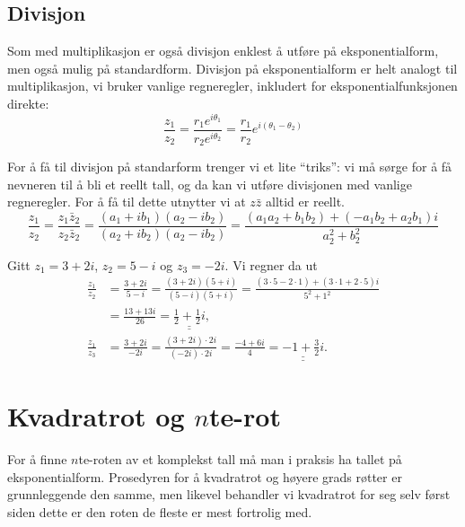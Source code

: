 \documentclass[a4paper,norsk,12pt]{article}
\newcommand{\ans}[1]{\underline{\underline{#1}}}
\newcounter{exa}
\begin{document}
\subsection{Divisjon}
Som med multiplikasjon er også divisjon enklest å utføre på eksponentialform, men også mulig på standardform. Divisjon på eksponentialform er helt analogt til multiplikasjon, vi bruker vanlige regneregler, inkludert for eksponentialfunksjonen direkte:
\begin{displaymath}
	\frac{z_1}{z_2} = \frac{r_1e^{i\theta_1}}{r_2e^{i\theta_2}} = \frac{r_1}{r_2}e^{i(\theta_1-\theta_2)}
\end{displaymath}
\begin{texample}
\end{texample}
For å få til divisjon på standarform trenger vi et lite ``triks'': vi må sørge for å få nevneren til å bli et reellt tall, og da kan vi utføre divisjonen med vanlige regneregler. For å få til dette utnytter vi at $z\bar{z}$ alltid er reellt.
\begin{displaymath}
	\frac{z_1}{z_2} = \frac{z_1\bar{z}_2}{z_2\bar{z}_2} = \frac{(a_1+ib_1)(a_2-ib_2)}{(a_2+ib_2)(a_2-ib_2)} = \frac{(a_1a_2+b_1b_2)+(-a_1b_2+a_2b_1)i}{a_2^2+b_2^2}
\end{displaymath}
\begin{texample}
Gitt $z_1 = 3+2i$, $z_2 = 5-i$ og $z_3 = -2i$. Vi regner da ut
\begin{align*}
	\frac{z_1}{z_2} &= \frac{3+2i}{5-i} = \frac{(3+2i)(5+i)}{(5-i)(5+i)} = \frac{(3\cdot5-2\cdot1) + (3\cdot1+2\cdot5)i}{5^2+1^2} \\
	&= \frac{13 + 13i}{26} = \ans{\frac12 + \frac12 i}, \\[12pt]
	\frac{z_1}{z_3} &= \frac{3+2i}{-2i} = \frac{(3+2i)\cdot2i}{(-2i)\cdot 2i} = \frac{-4+6i}{4} = \ans{-1+\frac{3}{2}i}.
\end{align*}
\end{texample}

\section{Kvadratrot og $n$te-rot}
For å finne $n$te-roten av et komplekst tall må man i praksis ha tallet på eksponentialform. Prosedyren for å kvadratrot og høyere grads røtter er grunnleggende den samme, men likevel behandler vi kvadratrot for seg selv først siden dette er den roten de fleste er mest fortrolig med. 
\end{document}
